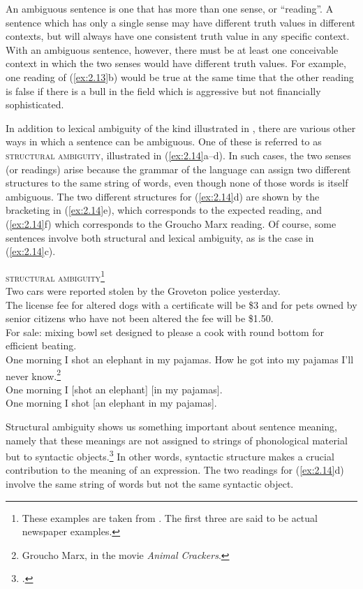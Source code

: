 An ambiguous sentence is one that has more than one sense, or “reading”. A sentence which has only a single sense may have different truth values in different contexts, but will always have one consistent truth value in any specific context. With an ambiguous sentence, however, there must be at least one conceivable context in which the two senses would have different truth values. For example, one reading of (\ref{ex:2.13}b) would be true at the same time that the other reading is false if there is a bull in the field which is aggressive but not financially sophisticated.\largerpage[2]



In addition to lexical ambiguity of the kind illustrated in , there are various other ways in which a sentence can be ambiguous. One of these is referred to as \textsc{structural ambiguity}, illustrated in (\ref{ex:2.14}a--d). In such cases, the two senses (or readings) arise because the grammar of the language can assign two different structures to the same string of words, even though none of those words is itself ambiguous. The two different structures for (\ref{ex:2.14}d) are shown by the bracketing in (\ref{ex:2.14}e), which corresponds to the expected reading, and (\ref{ex:2.14}f) which corresponds to the Groucho Marx reading. Of course, some sentences involve both structural and lexical ambiguity, as is the case in (\ref{ex:2.14}c).


\ea \label{ex:2.14}
\textsc{structural ambiguity}\footnote{These examples are taken from \citet[102]{Pinker1994}. The first three are said to be actual newspaper examples.}\\
\ea Two cars were reported stolen by the Groveton police yesterday.\\
\ex The license fee for altered dogs with a certificate will be \$3 and for pets owned by senior citizens who have not been altered the fee will be \$1.50.\\
\ex For sale: mixing bowl set designed to please a cook with round bottom for efficient beating.\\
\ex One morning I shot an elephant in my pajamas. How he got into my pajamas I’ll never know.\footnote{Groucho Marx, in the movie \textit{Animal Crackers}.}\\
\ex One morning I [shot an elephant] [in my pajamas].\\
\ex One morning I shot [an elephant in my pajamas].
                       \z
\z


Structural ambiguity shows us something important about sentence meaning, namely that these meanings are not assigned to strings of phonological material but to syntactic objects.\footnote{\citet[514]{Kennedy2011}.} In other words, syntactic structure makes a crucial contribution to the meaning of an expression. The two readings for (\ref{ex:2.14}d) involve the same string of words but not the same syntactic object.



